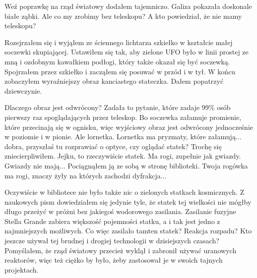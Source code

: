 \begin{dialogue}
	\ds{} Weź poprawkę na rząd światowy \dm{} dodałem tajemniczo. Galiza pokazała doskonale białe ząbki.
	\ds{} Ale co my zrobimy bez teleskopu?
	\ds{} A kto powiedział, że nie mamy teleskopu?
\end{dialogue}

Rozejrzałem się i wyjąłem ze ściennego lichtarza szkiełko w kształcie małej soczewki skupiającej.
Ustawiłem się tak, aby zielone UFO było w linii prostej ze mną i ozdobnym kawałkiem podłogi, który także okazał się być soczewką.
Spojrzałem przez szkiełko i zacząłem się posuwać w przód i w tył. W końcu zobaczyłem wyraźniejszy obraz kanciastego stateczka.
Dałem popatrzyć dziewczynie.

\begin{dialogue}
	\ds{} Dlaczego obraz jest odwrócony? \dm{} Zadała to pytanie, które zadaje 99\% osób pierwszy raz spoglądających przez teleskop.
	\ds{} Bo soczewka załamuje promienie, które przecinają się w ognisku, więc wyjściowy obraz jest odwrócony jednocześnie w poziomie i w pionie.
	\ds{} Ale lornetka.
	\ds{} Lornetka ma pryzmaty, które załamują... dobra, przyszłaś tu rozprawiać o optyce, czy oglądać statek? \dm{} Trochę się zniecierpliwiłem.
	\ds{} Jejku, to rzeczywiście statek. Ma rogi, zupełnie jak gwiazdy.
	\ds{} Gwiazdy nie mają... \dm{} Pociągnąłem ją ze sobą w stronę biblioteki. \dm{} Twoja rogówka ma rogi, znaczy żyły na których zachodzi dyfrakcja...
\end{dialogue}

Oczywiście w bibliotece nie było także nic o zielonych statkach kosmicznych.
Z naukowych pism dowiedziałem się jedynie tyle, że statek tej wielkości nie mógłby długo przeżyć w próżni bez jakiegoś wodorowego zasilania.
Zasilanie fuzyjne Stella Grande zabiera większość pojemności statku, a i tak jest jedno z najmniejszych możliwych. Co więc zasilało tamten statek?
Reakcja rozpadu? Kto jeszcze używał tej brudnej i drogiej technologii w dzisiejszych czasach?
Pomyślałem, że rząd światowy przecież wyklął i zabronił używać uranowych reaktorów, więc też ciężko by było, żeby zastosował je w swoich tajnych projektach.

